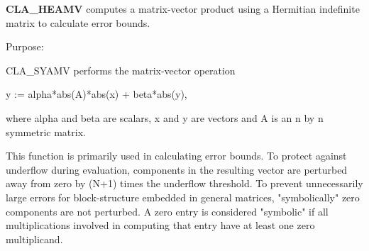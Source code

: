 {\bfseries C\+L\+A\+\_\+\+H\+E\+A\+M\+V} computes a matrix-\/vector product using a Hermitian indefinite matrix to calculate error bounds. 

 \begin{DoxyParagraph}{Purpose\+: }
\begin{DoxyVerb} CLA_SYAMV  performs the matrix-vector operation

         y := alpha*abs(A)*abs(x) + beta*abs(y),

 where alpha and beta are scalars, x and y are vectors and A is an
 n by n symmetric matrix.

 This function is primarily used in calculating error bounds.
 To protect against underflow during evaluation, components in
 the resulting vector are perturbed away from zero by (N+1)
 times the underflow threshold.  To prevent unnecessarily large
 errors for block-structure embedded in general matrices,
 "symbolically" zero components are not perturbed.  A zero
 entry is considered "symbolic" if all multiplications involved
 in computing that entry have at least one zero multiplicand.\end{DoxyVerb}
 
\end{DoxyParagraph}


